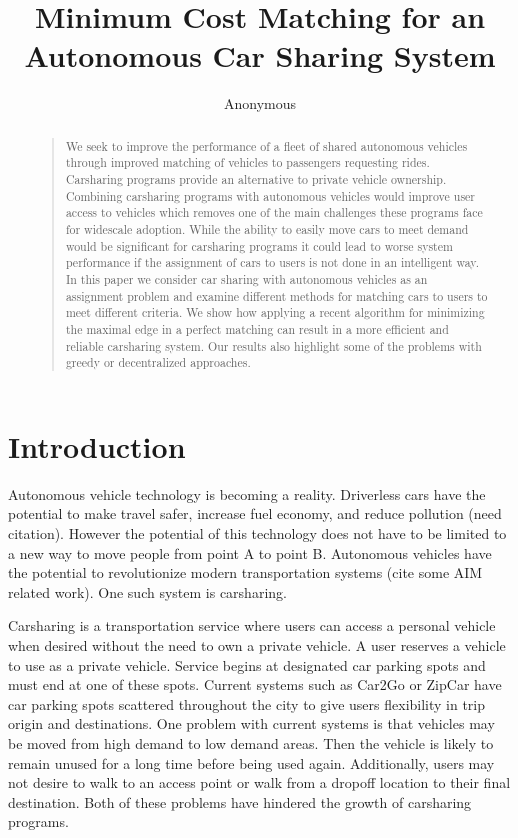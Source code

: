 \documentclass[letterpaper]{article}
\begin{document}
%
\title{Minimum Cost Matching for an Autonomous Car Sharing System}
\author{Anonymous}
\maketitle
\begin{abstract}
\begin{quote}
We seek to improve the performance of a fleet of shared autonomous vehicles through improved matching of vehicles to passengers requesting rides. Carsharing programs provide an alternative to private vehicle ownership. Combining carsharing programs with autonomous vehicles would improve user access to vehicles which removes one of the main challenges these programs face for widescale adoption. While the ability to easily move cars to meet demand would be significant for carsharing programs it could lead to worse system performance if the assignment of cars to users is not done in an intelligent way. In this paper we consider car sharing with autonomous vehicles as an assignment problem and examine different methods for matching cars to users to meet different criteria. We show how applying a recent algorithm for minimizing the maximal edge in a perfect matching can result in a more efficient and reliable carsharing system. Our results also highlight some of the problems with greedy or decentralized approaches.
\end{quote}
\end{abstract}

\noindent 

\section{Introduction}
Autonomous vehicle technology is becoming a reality. Driverless cars have the potential to make travel safer, increase fuel economy, and reduce pollution (need citation). However the potential of this technology does not have to be limited to a new way to move people from point A to point B. Autonomous vehicles have the potential to revolutionize modern transportation systems (cite some AIM related work). One such system is carsharing.

Carsharing is a transportation service where users can access a personal vehicle when desired without the need to own a private vehicle. A user reserves a vehicle to use as a private vehicle. Service begins at designated car parking spots and must end at one of these spots. Current systems such as Car2Go or ZipCar have car parking spots scattered throughout the city to give users flexibility in trip origin and destinations. One problem with current systems is that vehicles may be moved from high demand to low demand areas. Then the vehicle is likely to remain unused for a long time before being used again. Additionally, users may not desire to walk to an access point or walk from a dropoff location to their final destination. Both of these problems have hindered the growth of carsharing programs.
\end{document}
